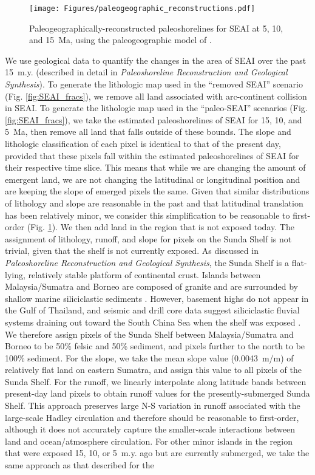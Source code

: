 \documentclass[11pt,letterpaper]{article}
\begin{document}
\begin{figure}[h!]
    \centering
    \texttt{[image: Figures/paleogeographic\_reconstructions.pdf]}
    \caption{Paleogeographically-reconstructed paleoshorelines for SEAI at 5, 10, and 15~Ma, using the paleogeographic model of \citet{Matthews2016a}.}
    \label{fig:paleogeographic_reconstructions}
\end{figure}

We use geological data to quantify the changes in the area of SEAI over the past 15~m.y. (described in detail in \textit{Paleoshoreline Reconstruction and Geological Synthesis}). To generate the lithologic map used in the ``removed SEAI'' scenario (Fig. \ref{fig:SEAI_fracs}), we remove all land associated with arc-continent collision in SEAI. To generate the lithologic map used in the ``paleo-SEAI'' scenarios (Fig. \ref{fig:SEAI_fracs}), we take the estimated paleoshorelines of SEAI for 15, 10, and 5~Ma, then remove all land that falls outside of these bounds. The slope and lithologic classification of each pixel is identical to that of the present day, provided that these pixels fall within the estimated paleoshorelines of SEAI for their respective time slice. This means that while we are changing the amount of emergent land, we are not changing the latitudinal or longitudinal position and are keeping the slope of emerged pixels the same. Given that similar distributions of lithology and slope are reasonable in the past and that latitudinal translation has been relatively minor, we consider this simplification to be reasonable to first-order (Fig. \ref{fig:paleogeographic_reconstructions}). We then add land in the region that is not exposed today. The assignment of lithology, runoff, and slope for pixels on the Sunda Shelf is not trivial, given that the shelf is not currently exposed. As discussed in \textit{Paleoshoreline Reconstruction and Geological Synthesis}, the Sunda Shelf is a flat-lying, relatively stable platform of continental crust. Islands between Malaysia/Sumatra and Borneo are composed of granite and are surrounded by shallow marine siliciclastic sediments \citep{Darmadi2007a, Hall2009a, Hall2013b}. However, basement highs do not appear in the Gulf of Thailand, and seismic and drill core data suggest siliciclastic fluvial systems draining out toward the South China Sea when the shelf was exposed \citep{Darmadi2007a}. We therefore assign pixels of the Sunda Shelf between Malaysia/Sumatra and Borneo to be 50\% felsic and 50\% sediment, and pixels further to the north to be 100\% sediment. For the slope, we take the mean slope value (0.0043~m/m) of relatively flat land on eastern Sumatra, and assign this value to all pixels of the Sunda Shelf. For the runoff, we linearly interpolate along latitude bands between present-day land pixels to obtain runoff values for the presently-submerged Sunda Shelf. This approach preserves large N-S variation in runoff associated with the large-scale Hadley circulation and therefore should be reasonable to first-order, although it does not accurately capture the smaller-scale interactions between land and ocean/atmosphere circulation. For other minor islands in the region that were exposed 15, 10, or 5~m.y. ago but are currently submerged, we take the same approach as that described for the 
\end{document}
